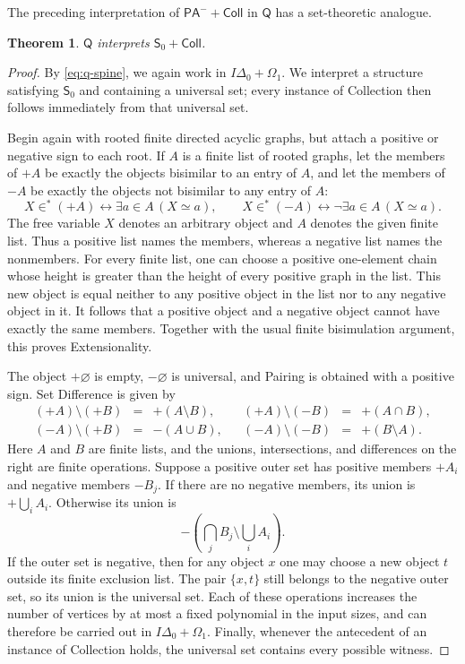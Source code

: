 \documentclass[11pt,a4paper]{article}
\newcommand{\Q}{\mathsf Q}
\newcommand{\PAminus}{\mathsf{PA}^{-}}
\newcommand{\IDelta}{I\Delta_{0}}
\newcommand{\OmegaOne}{\Omega_{1}}
\newcommand{\Szero}{\mathsf S_{0}}
\theoremstyle{plain}
\newtheorem{theorem}{Theorem}[section]
\theoremstyle{definition}
\theoremstyle{remark}
\begin{document}
The preceding interpretation of \(\PAminus+\mathsf{Coll}\) in \(\Q\) has a set-theoretic analogue.
\begin{theorem}
  \(\Q\) interprets \(\mathsf S_0+\mathsf{Coll}\).
\end{theorem}
\begin{proof}
  By \eqref{eq:q-spine}, we again work in \(\IDelta+\OmegaOne\). We interpret a structure satisfying \(\Szero\) and containing a universal set; every instance of Collection then follows immediately from that universal set.

  Begin again with rooted finite directed acyclic graphs, but attach a positive or negative sign to each root. If \(A\) is a finite list of rooted graphs, let the members of \(+A\) be exactly the objects bisimilar to an entry of \(A\), and let the members of \(-A\) be exactly the objects not bisimilar to any entry of \(A\):
  \[
  X\in^*(+A)\longleftrightarrow\exists a\in A\,(X\simeq a),
  \qquad
  X\in^*(-A)\longleftrightarrow\neg\exists a\in A\,(X\simeq a).
  \]
  The free variable \(X\) denotes an arbitrary object and \(A\) denotes the given finite list. Thus a positive list names the members, whereas a negative list names the nonmembers. For every finite list, one can choose a positive one-element chain whose height is greater than the height of every positive graph in the list. This new object is equal neither to any positive object in the list nor to any negative object in it. It follows that a positive object and a negative object cannot have exactly the same members. Together with the usual finite bisimulation argument, this proves Extensionality.

  The object \(+\varnothing\) is empty, \(-\varnothing\) is universal, and Pairing is obtained with a positive sign. Set Difference is given by
  \[
  \begin{array}{rclcrcl}
  (+A)\setminus(+B)&=&+(A\setminus B),&&
  (+A)\setminus(-B)&=&+(A\cap B),\\
  (-A)\setminus(+B)&=&-(A\cup B),&&
  (-A)\setminus(-B)&=&+(B\setminus A).
  \end{array}
  \]
  Here \(A\) and \(B\) are finite lists, and the unions, intersections, and differences on the right are finite operations. Suppose a positive outer set has positive members \(+A_i\) and negative members \(-B_j\). If there are no negative members, its union is \(+\bigcup_i A_i\). Otherwise its union is
  \[
    -\left(\bigcap_jB_j\setminus\bigcup_iA_i\right).
  \]
  If the outer set is negative, then for any object \(x\) one may choose a new object \(t\) outside its finite exclusion list. The pair \(\{x,t\}\) still belongs to the negative outer set, so its union is the universal set. Each of these operations increases the number of vertices by at most a fixed polynomial in the input sizes, and can therefore be carried out in \(\IDelta+\OmegaOne\). Finally, whenever the antecedent of an instance of Collection holds, the universal set contains every possible witness.
\end{proof}
\end{document}
